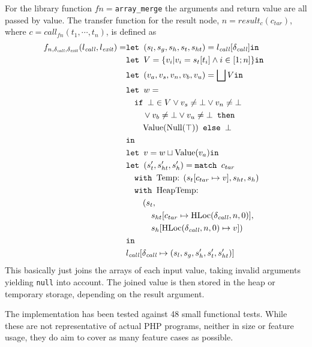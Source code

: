 For the library function $fn = $\texttt{array\_merge}  the arguments and return value are all passed by value. The transfer function for the result node, $n = \mathit{result}_{c}(c_{\mathit{tar}})$, where $c = \mathit{call}_{{fn}}(t_1,\cdots, t_n)$, is defined as 
\begin{align*}
f_{n,\delta_{\mathit{call}},\delta_{\mathit{exit}}}(l_{\mathit{call}}, l_{\mathit{exit}}) = 	&\texttt{let } (s_l, s_g, s_h, s_t, s_{ht}) = l_{\mathit{call}}[\delta_{\mathit{call}}] \texttt{in }\notag\\
																							&\texttt{let } V =  \{v_i| v_i = s_t[t_i]\wedge i \in [1;n]\} \texttt{in }\notag\\
																							&\texttt{let } (v_a,v_s, v_n, v_b, v_u) = \bigsqcup V \texttt{in }\notag\\
																							&\texttt{let } w =  \notag\\
																							&\quad\texttt{if }\bot \in V \vee v_s \neq \bot \vee v_n \neq \bot\notag\\
																							&\quad\quad \vee v_b \neq \bot \vee v_u \neq \bot\texttt{ then } \notag\\
																							&\quad\quad\text{Value}(\text{Null}(\top)) \texttt{ else } \bot\notag\\
																							& \texttt{in }\notag\\
																							&\texttt{let } v = w \sqcup \text{Value}(v_a) \texttt{in }\notag\\
																							&\texttt{let } (s_t', s_{ht}',s_h') = \texttt{match }c_{tar}\notag\\
																							&\quad\texttt{with }\text{Temp}\text{: } (s_t[c_{tar}\mapsto v], s_{ht}, s_h)\notag\\
																							&\quad\texttt{with }\text{HeapTemp}\text{: }\notag\\
																							&\quad\quad(s_t, \notag\\
																							&\quad\quad\quad s_{ht}[c_{tar}\mapsto \text{HLoc}(\delta_{\mathit{call}}, n, 0)], \notag\\
																							&\quad\quad\quad s_h[\text{HLoc}(\delta_{\mathit{call}}, n, 0)\mapsto v])\notag\\
																							& \texttt{in }\notag\\
																							&l_{\mathit{call}}[\delta_{\mathit{call}}\mapsto (s_l, s_g, s_h', s_t', s_{ht}')]
\end{align*} 
This basically just joins the arrays of each input value, taking invalid arguments yielding \texttt{null} into account. The joined value is then stored in the heap or temporary storage, depending on the result argument.

The implementation has been tested against 48 small functional tests. While these are not representative of actual PHP programs, neither in size or feature usage, they do aim to cover as many feature cases as possible.


